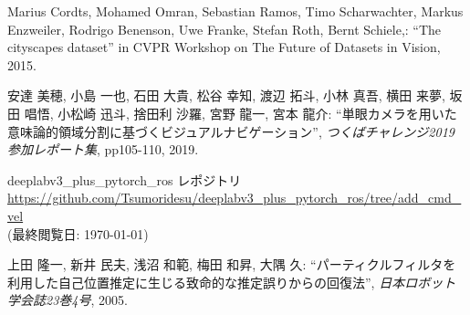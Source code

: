 \documentclass[uplatex, twocolumn, 9pt]{jsproceedings}
\begin{document}
\begin{thebibliography}{99}
Marius Cordts, Mohamed Omran, Sebastian Ramos, Timo Scharwachter, Markus Enzweiler, Rodrigo Benenson, Uwe Franke, Stefan Roth, Bernt Schiele,: ``The cityscapes dataset'' in CVPR Workshop on The Future of Datasets in Vision, 2015.

安達 美穂, 小島 一也, 石田 大貴, 松谷 幸知, 渡辺 拓斗, 小林 真吾, 横田 来夢, 坂田 唱悟, 小松崎 迅斗, 捨田利 沙羅, 宮野 龍一, 宮本 龍介: ``単眼カメラを用いた意味論的領域分割に基づくビジュアルナビゲーション'', \textit{つくばチャレンジ2019 参加レポート集}, pp105-110, 2019.

deeplabv3\_plus\_pytorch\_ros レポジトリ\\
\url{https://github.com/Tsumoridesu/deeplabv3_plus_pytorch_ros/tree/add_cmd_vel}\\
(最終閲覧日: \today)

上田 隆一, 新井 民夫, 浅沼 和範, 梅田 和昇, 大隅 久: ``パーティクルフィルタを利用した自己位置推定に生じる致命的な推定誤りからの回復法'', \textit{日本ロボット学会誌23巻4号}, 2005.

\end{thebibliography}
\normalsize
\end{document}
